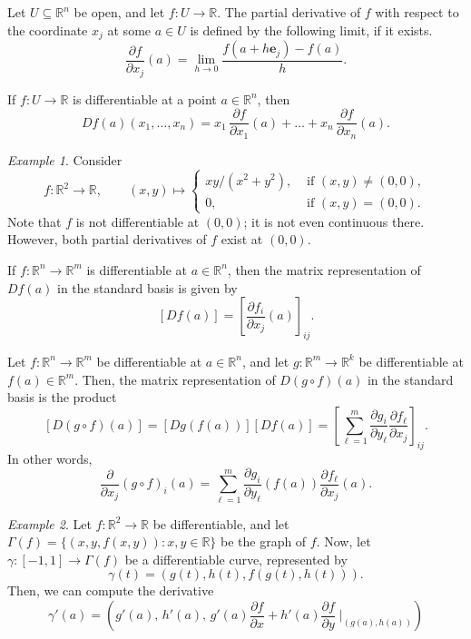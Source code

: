 \documentclass[11pt]{article}
\newcommand{\R}{\mathbb{R}}
\renewcommand{\vec}[1]{\boldsymbol{#1}}
\newcommand{\pp}[2]{\frac{\partial #1}{\partial #2}}
\theoremstyle{definition}
\theoremstyle{remark}
\newtheorem*{example}{Example}
\numberwithin{equation}{section}
\begin{document}
    \begin{definition}
        Let $U \subseteq \R^n$ be open, and let $f\colon U \to \R$. The partial
        derivative of $f$ with respect to the coordinate $x_j$ at some $a \in U$
        is defined by the following limit, if it exists. \[
            \pp{f}{x_j}(a) = \lim_{h \to 0} \frac{f(a + h\vec{e}_j) - f(a)}{h}.
        \] 
    \end{definition}
    \begin{lemma}
        If $f\colon U \to \R$ is differentiable at a point $a \in \R^n$, then \[
            Df(a)(x_1, \dots, x_n) = x_1 \,\pp{f}{x_1}(a) + \dots + x_n
            \,\pp{f}{x_n}(a).
        \] 
    \end{lemma}
    \begin{example}
        Consider \[
            f\colon \R^2 \to \R, \qquad (x, y) \mapsto \begin{cases}
                xy/(x^2 + y^2), &\text{ if } (x, y) \neq (0, 0), \\
                0, &\text{ if } (x, y) = (0, 0).
            \end{cases}
        \] Note that $f$ is not differentiable at $(0, 0)$; it is not even continuous
        there. However, both partial derivatives of $f$ exist at $(0, 0)$.
    \end{example}

    \begin{lemma}
        If $f\colon \R^n \to \R^m$ is differentiable at $a \in \R^n$, then the matrix
        representation of $Df(a)$ in the standard basis is given by \[
            [Df(a)] = \left[\pp{f_i}{x_j}(a)\right]_{ij}.
        \] 
    \end{lemma}

    \begin{lemma}
        Let $f\colon \R^n \to \R^m$ be differentiable at $a \in \R^n$, and let
        $g\colon \R^m \to \R^k$ be differentiable at $f(a) \in \R^m$. Then, the
        matrix representation of $D(g\circ f)(a)$ in the standard basis is the
        product \[
            [D(g\circ f)(a)] = [Dg(f(a))][Df(a)] = \left[\sum_{\ell = 1}^m
            \pp{g_i}{y_\ell}\pp{f_\ell}{x_j}\right]_{ij}.
        \] In other words, \[
            \pp{}{x_j}(g\circ f)_i(a) = \sum_{\ell = 1}^m \pp{g_i}{y_\ell}(f(a))
            \pp{f_\ell}{x_j}(a).
        \] 
    \end{lemma}

    \begin{example}
        Let $f\colon \R^2\to \R$ be differentiable, and let $\Gamma(f) = \{(x, y,
        f(x, y)): x, y \in \R\}$ be the graph of $f$. Now, let $\gamma\colon [-1, 1]
        \to \Gamma(f)$ be a differentiable curve, represented by \[
            \gamma(t) = (g(t), h(t), f(g(t), h(t))).
        \] Then, we can compute the derivative \[
            \gamma'(a) = \left(g'(a),\, h'(a),\, g'(a)\pp{f}{x} + h'(a)\pp{f}{y}
            \;\Big|_{(g(a), h(a))}\right)
        \] 
    \end{example}
\end{document}
